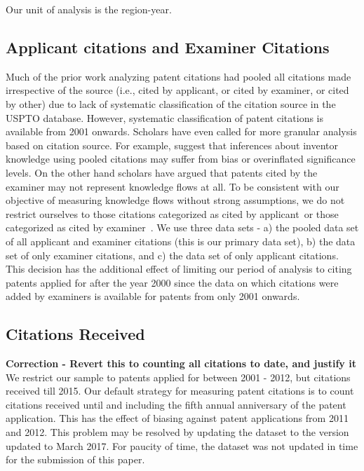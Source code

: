 \documentclass[12pt,letterpaper]{article}
\begin{document}
Our unit of analysis is the region-year. \par

\subsection{Applicant citations and Examiner Citations}
Much of the prior work analyzing patent citations had pooled all citations made irrespective of the source (i.e., cited by applicant, or cited by examiner, or cited by other) due to lack of systematic classification of the citation source in the USPTO database. However, systematic classification of patent citations is available from 2001 onwards. Scholars have even called for more granular analysis based on citation source. For example, \cite{Alcacer2006a} suggest that inferences about inventor knowledge using pooled citations may suffer from bias or overinflated significance levels. On the other hand scholars have argued that patents cited by the examiner may not represent knowledge flows at all. To be consistent with our objective of measuring knowledge flows without strong assumptions, we do not restrict ourselves to those citations categorized as \textquotesingle cited by applicant\textquotesingle \ or those categorized as \textquotesingle cited by examiner\textquotesingle \ . We use three data sets - a) the pooled data set of all applicant and examiner citations (this is our primary data set), b) the data set of only examiner citations, and c) the data set of only applicant citations. This decision has the additional effect of limiting our period of analysis to citing patents applied for after the year 2000 since the data on which citations were added by examiners is available for patents from only 2001 onwards. 

\subsection{Citations Received}
\textbf{Correction - Revert this to counting all citations to date, and justify it}
We restrict our sample to patents applied for between 2001 - 2012, but citations received till 2015. Our default strategy for measuring patent citations is to count citations received until and including the fifth annual anniversary of the patent application. This has the effect of biasing against patent applications from 2011 and 2012.  This problem may be resolved by updating the dataset to the version updated to March 2017. For paucity of time, the dataset was not updated in time for the submission of this paper.\par
\end{document}
